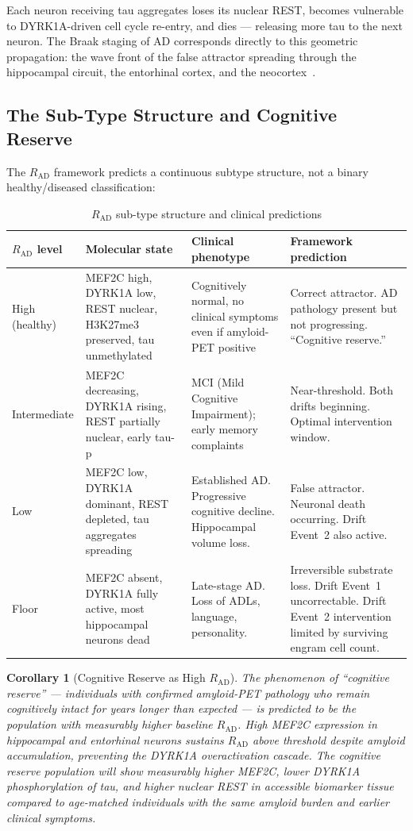 \documentclass[12pt,a4paper]{article}
\newtheorem{corollary}{Corollary}
\newcommand{\RAD}{R_{\mathrm{AD}}}
\begin{document}
Each neuron receiving tau aggregates loses its nuclear
REST, becomes vulnerable to DYRK1A-driven cell cycle
re-entry, and dies --- releasing more tau to the next
neuron. The Braak staging of AD corresponds directly
to this geometric propagation: the wave front of the
false attractor spreading through the hippocampal
circuit, the entorhinal cortex, and the neocortex~\cite{Braak1991}.

\subsection{The Sub-Type Structure and Cognitive Reserve}

The $\RAD$ framework predicts a continuous subtype
structure, not a binary healthy/diseased classification:

\begin{table}[ht!]
\centering
\caption{$\RAD$ sub-type structure and clinical predictions}
\label{tab:subtypes}
\begin{tabular}{p{2.2cm}p{3.5cm}p{3.0cm}p{3.0cm}}
\toprule
\textbf{$\RAD$ level} &
\textbf{Molecular state} &
\textbf{Clinical phenotype} &
\textbf{Framework prediction} \\
\midrule
High (healthy) &
MEF2C high, DYRK1A low, REST nuclear,
H3K27me3 preserved, tau unmethylated &
Cognitively normal, no clinical symptoms even
if amyloid-PET positive &
Correct attractor. AD pathology present but
not progressing. ``Cognitive reserve.'' \\[6pt]
Intermediate &
MEF2C decreasing, DYRK1A rising,
REST partially nuclear, early tau-p &
MCI (Mild Cognitive Impairment);
early memory complaints &
Near-threshold. Both drifts beginning.
Optimal intervention window. \\[6pt]
Low &
MEF2C low, DYRK1A dominant, REST
depleted, tau aggregates spreading &
Established AD. Progressive cognitive
decline. Hippocampal volume loss. &
False attractor. Neuronal death occurring.
Drift Event~2 also active. \\[6pt]
Floor &
MEF2C absent, DYRK1A fully active,
most hippocampal neurons dead &
Late-stage AD. Loss of ADLs, language,
personality. &
Irreversible substrate loss. Drift Event~1
uncorrectable. Drift Event~2 intervention
limited by surviving engram cell count. \\
\bottomrule
\end{tabular}
\end{table}

\begin{corollary}[Cognitive Reserve as High $\RAD$]
The phenomenon of ``cognitive reserve'' --- individuals
with confirmed amyloid-PET pathology who remain cognitively
intact for years longer than expected --- is predicted
to be the population with measurably higher baseline
$\RAD$. High MEF2C expression in hippocampal and
entorhinal neurons sustains $\RAD$ above threshold
despite amyloid accumulation, preventing the DYRK1A
overactivation cascade. The cognitive reserve
population will show measurably higher MEF2C, lower
DYRK1A phosphorylation of tau, and higher nuclear
REST in accessible biomarker tissue compared to
age-matched individuals with the same amyloid burden
and earlier clinical symptoms.
\end{corollary}
\end{document}

